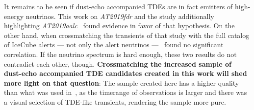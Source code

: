 It remains to be seen if dust-echo accompanied TDEs are in fact emitters of high-energy neutrinos. This work on \textit{AT2019fdr} and the study additionally highlighting \textit{AT2019aalc}~\cite{Velzen2021} found evidence in favor of that hypothesis. On the other hand, when crossmatching the transients of that study with the full catalog of IceCube alerts --- not only the alert neutrinos ---~ found no significant correlation. If the neutrino spectrum is hard enough, these two results do not contradict each other, though. \textbf{Crossmatching the increased sample of dust-echo accompanied TDE candidates created in this work will shed more light on that question}: The sample created here has a higher quality than what was used in~\cite{Velzen2021}, as the timerange of observations is larger and there was a visual selection of TDE-like transients, rendering the sample more pure.


